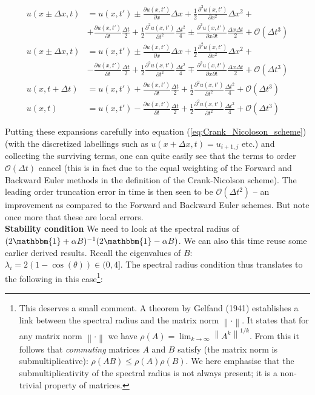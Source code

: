 \documentclass[a4paper, 11pt, notitlepage,english]{article}
\newcommand{\norm}[1]{\left\lVert #1 \right\rVert}
\newcommand{\id}{\mathbbm{1}}
\begin{document}
\begin{align}
u(x\pm\Delta x,t) &= u(x,t') \pm \frac{\partial u(x,t')}{\partial x}\Delta x + \frac{1}{2}\frac{\partial^2 u(x,t')}{\partial x^2}\Delta x^2 + \\
&+ \frac{\partial u(x,t')}{\partial t}\frac{\Delta t}{2} + \frac{1}{2}\frac{\partial^2 u(x,t')}{\partial t^2}\frac{\Delta t^2}{4} \pm \frac{\partial^2 u(x,t')}{\partial x \partial t}\frac{\Delta x \Delta t}{2} + \mathcal{O}(\Delta t^3)
\label{eq:Crank_Nicolson_expansions1} \\
u(x\pm\Delta x,t) &= u(x,t') \pm \frac{\partial u(x,t')}{\partial x}\Delta x + \frac{1}{2}\frac{\partial^2 u(x,t')}{\partial x^2}\Delta x^2 + \\
&- \frac{\partial u(x,t')}{\partial t}\frac{\Delta t}{2} + \frac{1}{2}\frac{\partial^2 u(x,t')}{\partial t^2}\frac{\Delta t^2}{4} \mp \frac{\partial^2 u(x,t')}{\partial x \partial t}\frac{\Delta x \Delta t}{2} + \mathcal{O}(\Delta t^3)
\label{eq:Crank_Nicolson_expansion2} \\
u(x,t+\Delta t) &= u(x,t') + \frac{\partial u(x,t')}{\partial t}\frac{\Delta t}{2} + \frac{1}{2}\frac{\partial^2 u(x,t')}{\partial t^2}\frac{\Delta t^2}{4}  + \mathcal{O}(\Delta t^3)
\label{eq:Crank_Nicolson_expansion3} \\
u(x,t) &= u(x,t') - \frac{\partial u(x,t')}{\partial t}\frac{\Delta t}{2} + \frac{1}{2}\frac{\partial^2 u(x,t')}{\partial t^2}\frac{\Delta t^2}{4}  + \mathcal{O}(\Delta t^3)
\label{eq:Crank_Nicolson_expansion4}
\end{align}

Putting these expansions carefully into equation (\ref{eq:Crank_Nicoloson_scheme}) (with the discretized labellings such as $u(x+\Delta x,t) = u_{i+1,j}$ etc.) and collecting the surviving terms, one can quite easily see that the terms to order $\mathcal{O}(\Delta t)$ cancel (this is in fact due to the equal weighting of the Forward and Backward Euler methods in the definition of the Crank-Nicolson scheme). The leading order truncation error in time is then seen to be $\mathcal{O}(\Delta t^2)$ – an improvement as compared to the Forward and Backward Euler schemes. But note once more that these are local errors. \\

\textbf{Stability condition} \newline
We need to look at the spectral radius of $(2\id + \alpha B)^{-1}(2\id -\alpha B)$. We can also this time reuse some earlier derived results. Recall the eigenvalues of $B$: $\lambda_i = 2(1-\cos(\theta) ) \in (0,4]$. The spectral radius condition thus translates to the following in this case\footnote{This deserves a small comment. A theorem by Gelfand (1941) establishes a link between the spectral radius and the matrix norm $\norm{\cdot}$. It states that for any matrix norm $\norm{\cdot}$ we have $\rho(A) = \lim_{k\to \infty} \norm{A^k}^{1/k}$. From this it follows that \emph{commuting} matrices $A$ and $B$ satisfy (the matrix norm is submultiplicative): $\rho(AB) \leq \rho(A)\rho(B)$. We here emphasise that the  submultiplicativity of the spectral radius is not always present; it is a non-trivial property of matrices.}:
\end{document}
